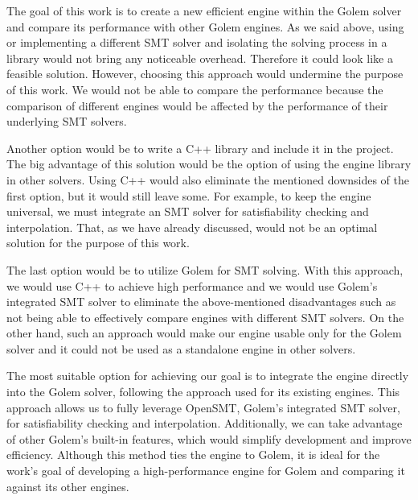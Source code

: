 The goal of this work is to create a new efficient engine within the Golem solver and compare its
performance with other Golem engines. As we said above, using or implementing a different SMT solver and isolating the solving process in a library would not
bring any noticeable overhead. Therefore it could look like a feasible
solution. However, choosing this approach would undermine the purpose of this work. We would not be able to compare the performance because the comparison
of different engines would be affected by the performance of their underlying
SMT solvers.

Another option would be to write a C++ library and include it in the project.
The big advantage of this solution would be the option of using the engine library
in other solvers. Using C++ would also eliminate the mentioned downsides of the
first option, but it would still leave some. For example, to keep the engine
universal, we must integrate an SMT solver for satisfiability checking
and interpolation. That, as we have already discussed, would not be an
optimal solution for the purpose of this work. 

The last option would be to utilize Golem for SMT solving. With this approach, we would use C++ to achieve high performance and we would use Golem's integrated SMT solver to eliminate the above-mentioned disadvantages such as not being able to effectively compare engines with different SMT solvers. On the other hand, such an approach would make our engine usable only for the Golem solver and it could not be used as a standalone engine in other solvers.

The most suitable option for achieving our goal is to integrate the engine directly into the Golem solver, following the approach used for its existing engines. This approach allows us to fully leverage OpenSMT, Golem’s integrated SMT solver, for satisfiability checking and interpolation. Additionally, we can take advantage of other Golem’s built-in features, which would simplify development and improve efficiency. Although this method ties the engine to Golem, it is ideal for the work's goal of developing a high-performance engine for Golem and comparing it against its other engines.

